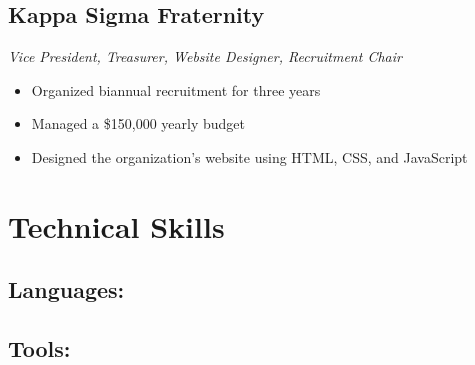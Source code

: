 \documentclass[10pt]{article}
\begin{document}
\begin{multicols}{2}
\subsection{Kappa Sigma Fraternity}

\noindent\textit{Vice President, Treasurer, Website Designer, Recruitment Chair}

\begin{itemize}
	\setlength\itemsep{0em}
	\item Organized biannual recruitment for three years
	\item Managed a \$150,000 yearly budget
	\item Designed the organization's website using HTML, CSS, and JavaScript
\end{itemize}

\end{multicols}

\vfill

\section{Technical Skills}

\subsection{Languages: }

\subsection{Tools: }
\end{document}
